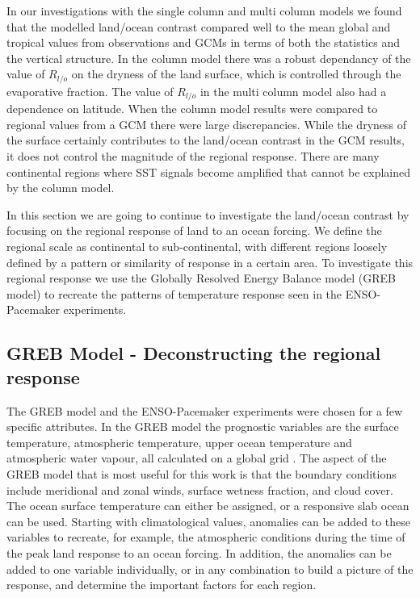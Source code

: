In our investigations with the single column and multi column models we found 
that the modelled land/ocean contrast compared well to the mean global and 
tropical values from observations and GCMs in terms of both the statistics and 
the vertical structure. In the column model there was a robust dependancy of the 
value of $R_{l/o}$ on the dryness of the land surface, which is controlled 
through the evaporative fraction. The value of $R_{l/o}$ in the multi column 
model also had a dependence on latitude. When the column model results were 
compared to regional values from a GCM there were large discrepancies.  While 
the dryness of the surface certainly contributes to the land/ocean contrast in 
the GCM results, it does not control the magnitude of the regional response. 
There are many continental regions where SST signals become amplified that 
cannot be explained by the column model.

In this section we are going to continue to investigate the land/ocean contrast 
by focusing on the regional response of land to an ocean forcing. We define the 
regional scale as continental to sub-continental, with different regions loosely 
defined by a pattern or similarity of response in a certain area. To investigate 
this regional response we use the Globally Resolved Energy Balance model (GREB 
model)  to recreate the patterns of temperature response seen in the 
ENSO-Pacemaker experiments.  

\subsection{GREB Model - Deconstructing the regional response}

The GREB model and the ENSO-Pacemaker experiments were chosen for a few specific 
attributes. In the GREB model the prognostic variables are the surface 
temperature, atmospheric temperature, upper ocean temperature and atmospheric 
water vapour, all calculated on a global grid \citep{Dommenget2011}. The aspect 
of the GREB model that is most useful for this work is that the boundary 
conditions include meridional and zonal winds, surface wetness fraction, and 
cloud cover.  The ocean surface temperature can either be assigned, or a 
responsive slab ocean can be used.  Starting with climatological values, 
anomalies can be added to these variables to recreate, for example, the 
atmospheric conditions during the time of the peak land response to an ocean 
forcing. In addition, the anomalies can be added to one variable individually, 
or in any combination to build a picture of the response, and determine the 
important factors for each region.


